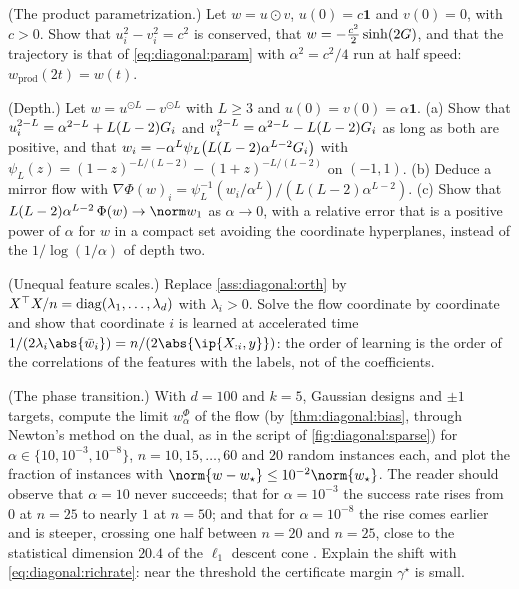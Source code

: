 \begin{refsection}
\begin{exercises}
\item \variation (The product parametrization.) Let $w=u\odot v$, $u(0)=c\mathbf1$ and $v(0)=0$, with $c>0$. Show that $u_i^2-v_i^2=c^2$ is conserved, that $w=-\frac{c^2}2\sinh(2G)$, and that the trajectory is that of \eqref{eq:diagonal:param} with $\alpha^2=c^2/4$ run at half speed: $w_{\mathrm{prod}}(2t)=w(t)$. \label{ex:diagonal:product}

\item \variation\hard (Depth.) Let $w=u^{\odot L}-v^{\odot L}$ with $L\ge3$ and $u(0)=v(0)=\alpha\mathbf1$. (a) Show that $u_i^{2-L}=\alpha^{2-L}+L(L-2)G_i$ and $v_i^{2-L}=\alpha^{2-L}-L(L-2)G_i$ as long as both are positive, and that $w_i=-\alpha^L\psi_L\bigl(L(L-2)\alpha^{L-2}G_i\bigr)$ with $\psi_L(z)=(1-z)^{-L/(L-2)}-(1+z)^{-L/(L-2)}$ on $(-1,1)$. (b) Deduce a mirror flow with $\nabla\Phi(w)_i=\psi_L^{-1}(w_i/\alpha^L)/(L(L-2)\alpha^{L-2})$. (c) Show that $L(L-2)\alpha^{L-2}\,\Phi(w)\to\norm w_1$ as $\alpha\to0$, with a relative error that is a positive power of $\alpha$ for $w$ in a compact set avoiding the coordinate hyperplanes, instead of the $1/\log(1/\alpha)$ of depth two. \label{ex:diagonal:depth}

\item \variation (Unequal feature scales.) Replace \cref{ass:diagonal:orth} by $X^\top X/n=\operatorname{diag}(\lambda_1,\dots,\lambda_d)$ with $\lambda_i>0$. Solve the flow coordinate by coordinate and show that coordinate $i$ is learned at accelerated time $1/(2\lambda_i\abs{\diagbar_i})=n/(2\abs{\ip{X_{:i},y}})$: the order of learning is the order of the correlations of the features with the labels, not of the coefficients. \label{ex:diagonal:scales}

\item \simulation (The phase transition.) With $d=100$ and $k=5$, Gaussian designs and $\pm1$ targets, compute the limit $w^\Phi_\alpha$ of the flow (by \cref{thm:diagonal:bias}, through Newton's method on the dual, as in the script of \cref{fig:diagonal:sparse}) for $\alpha\in\{10,10^{-3},10^{-8}\}$, $n=10,15,\dots,60$ and $20$ random instances each, and plot the fraction of instances with $\norm{w-w_\star}\le10^{-2}\norm{w_\star}$. The reader should observe that $\alpha=10$ never succeeds; that for $\alpha=10^{-3}$ the success rate rises from $0$ at $n=25$ to nearly $1$ at $n=50$; and that for $\alpha=10^{-8}$ the rise comes earlier and is steeper, crossing one half between $n=20$ and $n=25$, close to the statistical dimension $20.4$ of the $\ell_1$ descent cone \parencite{AmelunxenEtAl2014}. Explain the shift with \eqref{eq:diagonal:richrate}: near the threshold the certificate margin $\gamma^\star$ is small. \label{ex:diagonal:transition}


\end{exercises}
\end{refsection}
